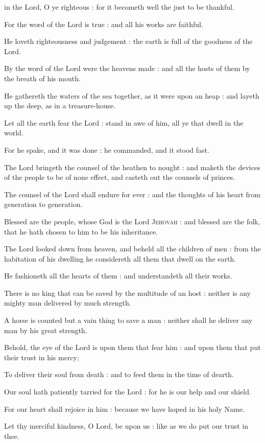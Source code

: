  in the Lord, O ye righteous : for it becometh well the just to be thankful.\par
{}
For the word of the Lord is true : and all his works are faithful.\par
{}He loveth righteousness and judgement : the earth is full of the goodness of the Lord.\par
{}By the word of the Lord were the heavens made : and all the hosts of them by the breath of his mouth.\par
{}He gathereth the waters of the sea together, as it were upon an heap : and layeth up the deep, as in a treasure-house.\par
{}Let all the earth fear the Lord : stand in awe of him, all ye that dwell in the world.\par
{}For he spake, and it was done : he commanded, and it stood fast.\par
{}The Lord bringeth the counsel of the heathen to nought : and maketh the devices of the people to be of none effect, and casteth out the counsels of princes.\par
{}The counsel of the Lord shall endure for ever : and the thoughts of his heart from generation to generation.\par
{}Blessed are the people, whose God is the Lord \textsc{Jehovah} : and blessed are the folk, that he hath chosen to him to be his inheritance.\par
{}The Lord looked down from heaven, and beheld all the children of men : from the habitation of his dwelling he considereth all them that dwell on the earth.\par
{}He fashioneth all the hearts of them : and understandeth all their works.\par
{}There is no king that can be saved by the multitude of an host : neither is any mighty man delivered by much strength.\par
{}A horse is counted but a vain thing to save a man : neither shall he deliver any man by his great strength.\par
{}Behold, the eye of the Lord is upon them that fear him : and upon them that put their trust in his mercy;\par
{}To deliver their soul from death : and to feed them in the time of dearth.\par
{}Our soul hath patiently tarried for the Lord : for he is our help and our shield.\par
{}For our heart shall rejoice in him : because we have hoped in his holy Name.\par
{}Let thy merciful kindness, O Lord, be upon us : like as we do put our trust in thee.\par

